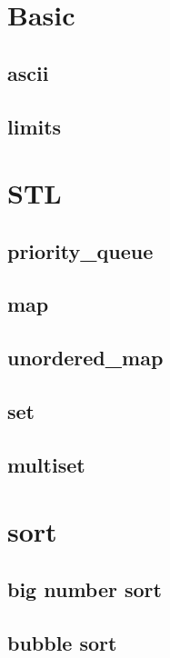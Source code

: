 \section{Basic}
    \subsection{ascii}
        
    \subsection{limits}
        

\section{STL}
    \subsection{priority\_queue}
        
    \subsection{map}
        
    \subsection{unordered\_map}
        
    \subsection{set}
        
    \subsection{multiset}
        

\section{sort}
    \subsection{big number sort}
        
    \subsection{bubble sort}
        

